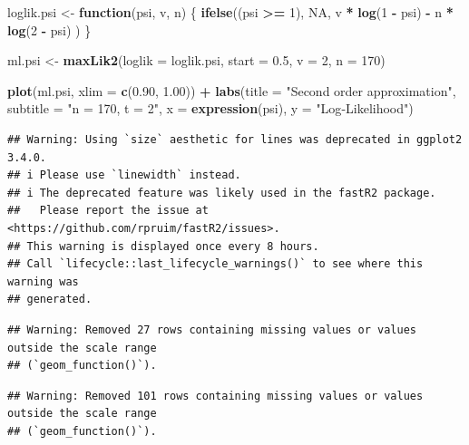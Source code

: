 \documentclass[
  11pt,
]{article}
\newenvironment{Shaded}{\begin{snugshade}}{\end{snugshade}}
\newcommand{\AttributeTok}[1]{\textcolor[rgb]{0.13,0.29,0.53}{#1}}
\newcommand{\ConstantTok}[1]{\textcolor[rgb]{0.56,0.35,0.01}{#1}}
\newcommand{\ControlFlowTok}[1]{\textcolor[rgb]{0.13,0.29,0.53}{\textbf{#1}}}
\newcommand{\DecValTok}[1]{\textcolor[rgb]{0.00,0.00,0.81}{#1}}
\newcommand{\FloatTok}[1]{\textcolor[rgb]{0.00,0.00,0.81}{#1}}
\newcommand{\FunctionTok}[1]{\textcolor[rgb]{0.13,0.29,0.53}{\textbf{#1}}}
\newcommand{\NormalTok}[1]{#1}
\newcommand{\OtherTok}[1]{\textcolor[rgb]{0.56,0.35,0.01}{#1}}
\newcommand{\SpecialCharTok}[1]{\textcolor[rgb]{0.81,0.36,0.00}{\textbf{#1}}}
\newcommand{\StringTok}[1]{\textcolor[rgb]{0.31,0.60,0.02}{#1}}
\begin{document}
\begin{Shaded}
\begin{Highlighting}[]
\NormalTok{loglik.psi }\OtherTok{\textless{}{-}} \ControlFlowTok{function}\NormalTok{(psi, v, n) \{}
  \FunctionTok{ifelse}\NormalTok{((psi }\SpecialCharTok{\textgreater{}=} \DecValTok{1}\NormalTok{), }\ConstantTok{NA}\NormalTok{,}
\NormalTok{    v }\SpecialCharTok{*} \FunctionTok{log}\NormalTok{(}\DecValTok{1} \SpecialCharTok{{-}}\NormalTok{ psi) }\SpecialCharTok{{-}}\NormalTok{ n }\SpecialCharTok{*} \FunctionTok{log}\NormalTok{(}\DecValTok{2} \SpecialCharTok{{-}}\NormalTok{ psi)}
\NormalTok{  )}
\NormalTok{\}}

\NormalTok{ml.psi }\OtherTok{\textless{}{-}} \FunctionTok{maxLik2}\NormalTok{(}\AttributeTok{loglik =}\NormalTok{ loglik.psi,}
                  \AttributeTok{start =} \FloatTok{0.5}\NormalTok{,}
                  \AttributeTok{v =} \DecValTok{2}\NormalTok{,}
                  \AttributeTok{n =} \DecValTok{170}\NormalTok{)}

\FunctionTok{plot}\NormalTok{(ml.psi, }\AttributeTok{xlim =} \FunctionTok{c}\NormalTok{(}\FloatTok{0.90}\NormalTok{, }\FloatTok{1.00}\NormalTok{)) }\SpecialCharTok{+}
  \FunctionTok{labs}\NormalTok{(}\AttributeTok{title =} \StringTok{"Second order approximation"}\NormalTok{,}
       \AttributeTok{subtitle =} \StringTok{"n = 170, t = 2"}\NormalTok{,}
       \AttributeTok{x =} \FunctionTok{expression}\NormalTok{(psi),}
       \AttributeTok{y =} \StringTok{"Log{-}Likelihood"}\NormalTok{)}
\end{Highlighting}
\end{Shaded}

\begin{verbatim}
## Warning: Using `size` aesthetic for lines was deprecated in ggplot2 3.4.0.
## i Please use `linewidth` instead.
## i The deprecated feature was likely used in the fastR2 package.
##   Please report the issue at <https://github.com/rpruim/fastR2/issues>.
## This warning is displayed once every 8 hours.
## Call `lifecycle::last_lifecycle_warnings()` to see where this warning was
## generated.
\end{verbatim}

\begin{verbatim}
## Warning: Removed 27 rows containing missing values or values outside the scale range
## (`geom_function()`).
\end{verbatim}

\begin{verbatim}
## Warning: Removed 101 rows containing missing values or values outside the scale range
## (`geom_function()`).
\end{verbatim}
\end{document}
